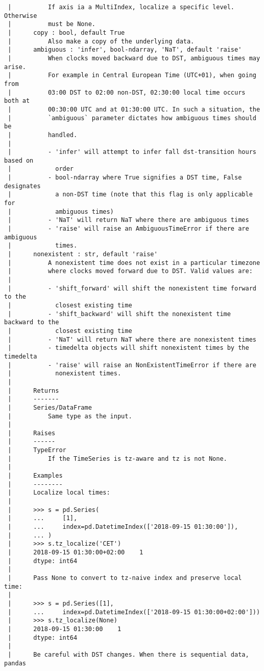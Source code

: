 \documentclass[
  letterpaper,
  DIV=11,
  numbers=noendperiod]{scrreprt}
\begin{document}
\begin{verbatim}
 |          If axis ia a MultiIndex, localize a specific level. Otherwise
 |          must be None.
 |      copy : bool, default True
 |          Also make a copy of the underlying data.
 |      ambiguous : 'infer', bool-ndarray, 'NaT', default 'raise'
 |          When clocks moved backward due to DST, ambiguous times may arise.
 |          For example in Central European Time (UTC+01), when going from
 |          03:00 DST to 02:00 non-DST, 02:30:00 local time occurs both at
 |          00:30:00 UTC and at 01:30:00 UTC. In such a situation, the
 |          `ambiguous` parameter dictates how ambiguous times should be
 |          handled.
 |      
 |          - 'infer' will attempt to infer fall dst-transition hours based on
 |            order
 |          - bool-ndarray where True signifies a DST time, False designates
 |            a non-DST time (note that this flag is only applicable for
 |            ambiguous times)
 |          - 'NaT' will return NaT where there are ambiguous times
 |          - 'raise' will raise an AmbiguousTimeError if there are ambiguous
 |            times.
 |      nonexistent : str, default 'raise'
 |          A nonexistent time does not exist in a particular timezone
 |          where clocks moved forward due to DST. Valid values are:
 |      
 |          - 'shift_forward' will shift the nonexistent time forward to the
 |            closest existing time
 |          - 'shift_backward' will shift the nonexistent time backward to the
 |            closest existing time
 |          - 'NaT' will return NaT where there are nonexistent times
 |          - timedelta objects will shift nonexistent times by the timedelta
 |          - 'raise' will raise an NonExistentTimeError if there are
 |            nonexistent times.
 |      
 |      Returns
 |      -------
 |      Series/DataFrame
 |          Same type as the input.
 |      
 |      Raises
 |      ------
 |      TypeError
 |          If the TimeSeries is tz-aware and tz is not None.
 |      
 |      Examples
 |      --------
 |      Localize local times:
 |      
 |      >>> s = pd.Series(
 |      ...     [1],
 |      ...     index=pd.DatetimeIndex(['2018-09-15 01:30:00']),
 |      ... )
 |      >>> s.tz_localize('CET')
 |      2018-09-15 01:30:00+02:00    1
 |      dtype: int64
 |      
 |      Pass None to convert to tz-naive index and preserve local time:
 |      
 |      >>> s = pd.Series([1],
 |      ...     index=pd.DatetimeIndex(['2018-09-15 01:30:00+02:00']))
 |      >>> s.tz_localize(None)
 |      2018-09-15 01:30:00    1
 |      dtype: int64
 |      
 |      Be careful with DST changes. When there is sequential data, pandas

\end{verbatim}
\end{document}
